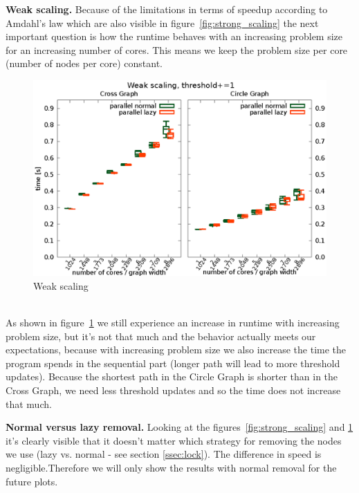 \documentclass[letterpaper]{article}
\newcommand{\mypar}[1]{{\bf #1.}}
\begin{document}
\mypar{Weak scaling}
Because of the limitations in terms of speedup according to Amdahl's law which are also visible in figure~\ref{fig:strong_scaling} the next important question is how the runtime behaves with an increasing problem size for an increasing number of cores. This means we keep the problem size per core (number of nodes per core) constant.
\begin{figure}[h]\centering
  \includegraphics[scale=0.558]{weak_scaling.eps}
  \caption{Weak scaling\label{fig:weak_scaling}}
\end{figure}\\
As shown in figure~\ref{fig:weak_scaling} we still experience an increase in runtime with increasing problem size, but it's not that much and the behavior actually meets our expectations, because with increasing problem size we also increase the time the program spends in the sequential part (longer path will lead to more threshold updates). Because the shortest path in the Circle Graph is shorter than in the Cross Graph, we need less threshold updates and so the time does not increase that much.

\mypar{Normal versus lazy removal} Looking at the figures~\ref{fig:strong_scaling} and \ref{fig:weak_scaling} it's clearly visible that it doesn't matter which strategy for removing the nodes we use (lazy vs. normal - see section \ref{ssec:lock}). The difference in speed is negligible.Therefore we will only show the results with normal removal for the future plots.
\end{document}
